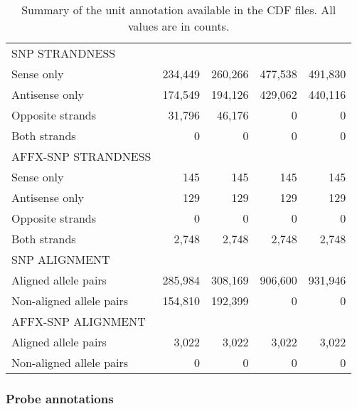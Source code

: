 \documentclass[10pt,a4paper]{article}
\begin{document}
\begin{table}[htp]
\begin{center}
\begin{tabular}{|l|rr||rr|}
\hline									            						             
SNP STRANDNESS					&	  				&	  				&	 				   &	 		     \\
Sense only              &  234,449  &  260,266  &   477,538 &    491,830 \\
Antisense only          &  174,549  &  194,126  &   429,062  &   440,116 \\
Opposite strands        &   31,796  &   46,176  &         0  &         0 \\
Both strands            &        0  &        0  &         0  &         0 \\
\hline									            						             
AFFX-SNP STRANDNESS 		&	  				&	  				&	 				   &	 		     \\
Sense only              &      145  &      145  &       145  &       145 \\
Antisense only          &      129  &      129  &       129  &       129 \\
Opposite strands        &        0  &        0  &         0  &         0 \\
Both strands            &    2,748  &    2,748  &     2,748  &     2,748 \\
\hline									            						             
SNP ALIGNMENT	           &	  			 &           &	 		      &	 		      \\
Aligned allele pairs     &  285,984  &  308,169  &   906,600  &   931,946 \\
Non-aligned allele pairs &  154,810  &  192,399  &         0  &         0 \\
\hline									            						             
AFFX-SNP ALIGNMENT	     &	  			 &	  				&	 		       &	 		      \\
Aligned allele pairs     &    3,022  &    3,022  &    3,022  &     3,022  \\
Non-aligned allele pairs &        0  &        0  &        0  &         0  \\
\hline									            						             
\end{tabular}
\end{center}
\caption{Summary of the unit annotation available in the CDF files.  All values are in counts.}  %
\label{tblCdfUnits}
\end{table}


\subsubsection{Probe annotations}
\end{document}
